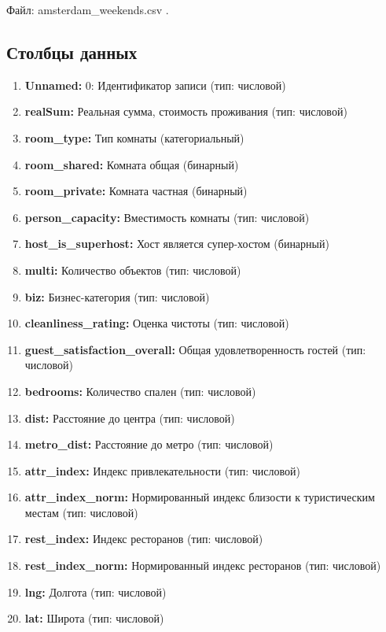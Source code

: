 \documentclass[
	11pt
] {article}
\begin{document}
	Файл: amsterdam\_weekends.csv \cite{kaggleAirbnbPrices}.

\subsection{Столбцы данных}
	\begin{enumerate}
		\item \textbf{Unnamed:} 0: Идентификатор записи (тип: числовой)
		\item \textbf{realSum:} Реальная сумма, стоимость проживания (тип: числовой)
		\item \textbf{room\_type:} Тип комнаты (категориальный)
		\item \textbf{room\_shared:} Комната общая (бинарный)
		\item \textbf{room\_private:} Комната частная (бинарный)
		\item \textbf{person\_capacity:} Вместимость комнаты (тип: числовой)
		\item \textbf{host\_is\_superhost:} Хост является супер-хостом (бинарный)
		\item \textbf{multi:} Количество объектов (тип: числовой)
		\item \textbf{biz:} Бизнес-категория (тип: числовой)
		\item \textbf{cleanliness\_rating:} Оценка чистоты (тип: числовой)
		\item \textbf{guest\_satisfaction\_overall:} Общая удовлетворенность гостей (тип: числовой)
		\item \textbf{bedrooms:} Количество спален (тип: числовой)
		\item \textbf{dist:} Расстояние до центра (тип: числовой)
		\item \textbf{metro\_dist:} Расстояние до метро (тип: числовой)
		\item \textbf{attr\_index:} Индекс привлекательности (тип: числовой)
		\item \textbf{attr\_index\_norm:} Нормированный индекс близости к туристическим местам (тип: числовой)
		\item \textbf{rest\_index:} Индекс ресторанов (тип: числовой)
		\item \textbf{rest\_index\_norm:} Нормированный индекс ресторанов (тип: числовой)
		\item \textbf{lng:} Долгота (тип: числовой)
		\item \textbf{lat:} Широта (тип: числовой)
	\end{enumerate}
\end{document}
